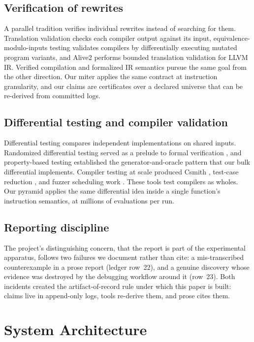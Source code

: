 \documentclass[journal,10pt]{IEEEtran}
\begin{document}
\subsection{Verification of rewrites}
A parallel tradition verifies individual rewrites instead of searching
for them. Translation validation \cite{pnueli98,nec00} checks each
compiler output against its input, equivalence-modulo-inputs testing
\cite{emi14} validates compilers by differentially executing mutated
program variants, and Alive2 \cite{alive2} performs bounded
translation validation for LLVM IR. Verified compilation \cite{leroy09}
and formalized IR semantics \cite{vellvm12} pursue the same goal from
the other direction. Our miter applies the same contract at
instruction granularity, and our claims are certificates over a
declared universe that can be re-derived from committed logs.

\subsection{Differential testing and compiler validation}
Differential testing \cite{mckeeman98} compares independent
implementations on shared inputs. Randomized differential testing
served as a prelude to formal verification \cite{groce07}, and
property-based testing \cite{quickcheck00} established the
generator-and-oracle pattern that our bulk differential implements.
Compiler testing at scale produced Csmith \cite{csmith11}, test-case
reduction \cite{regehr12}, and fuzzer scheduling work \cite{chen13}.
These tools test compilers as wholes. Our pyramid applies the same
differential idea inside a single function's instruction semantics, at
millions of evaluations per run.

\subsection{Reporting discipline}
The project's distinguishing concern, that the report is part of the
experimental apparatus, follows two failures we document rather than
cite: a mis-transcribed counterexample in a prose report (ledger
row~22), and a genuine discovery whose evidence was destroyed by the
debugging workflow around it (row~23). Both incidents created the
artifact-of-record rule under which this paper is built: claims live
in append-only logs, tools re-derive them, and prose cites them.

\section{System Architecture}
\label{sec:arch}
\end{document}
